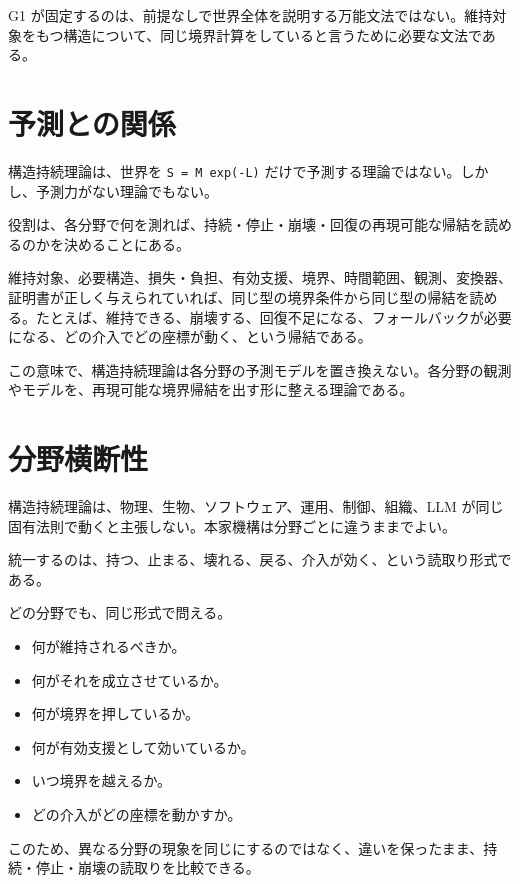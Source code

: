 \documentclass[12pt,a4paper]{article}
\begin{document}
G1 が固定するのは、前提なしで世界全体を説明する万能文法ではない。維持対象をもつ構造について、同じ境界計算をしていると言うために必要な文法である。

\section{予測との関係}\label{ux4e88ux6e2cux3068ux306eux95a2ux4fc2}

構造持続理論は、世界を \texttt{S\ =\ M\ exp(-L)} だけで予測する理論ではない。しかし、予測力がない理論でもない。

役割は、各分野で何を測れば、持続・停止・崩壊・回復の再現可能な帰結を読めるのかを決めることにある。

維持対象、必要構造、損失・負担、有効支援、境界、時間範囲、観測、変換器、証明書が正しく与えられていれば、同じ型の境界条件から同じ型の帰結を読める。たとえば、維持できる、崩壊する、回復不足になる、フォールバックが必要になる、どの介入でどの座標が動く、という帰結である。

この意味で、構造持続理論は各分野の予測モデルを置き換えない。各分野の観測やモデルを、再現可能な境界帰結を出す形に整える理論である。

\section{分野横断性}\label{ux5206ux91ceux6a2aux65adux6027}

構造持続理論は、物理、生物、ソフトウェア、運用、制御、組織、LLM が同じ固有法則で動くと主張しない。本家機構は分野ごとに違うままでよい。

統一するのは、持つ、止まる、壊れる、戻る、介入が効く、という読取り形式である。

どの分野でも、同じ形式で問える。

\begin{itemize}
\tightlist
\item
  何が維持されるべきか。
\item
  何がそれを成立させているか。
\item
  何が境界を押しているか。
\item
  何が有効支援として効いているか。
\item
  いつ境界を越えるか。
\item
  どの介入がどの座標を動かすか。
\end{itemize}

このため、異なる分野の現象を同じにするのではなく、違いを保ったまま、持続・停止・崩壊の読取りを比較できる。
\end{document}
